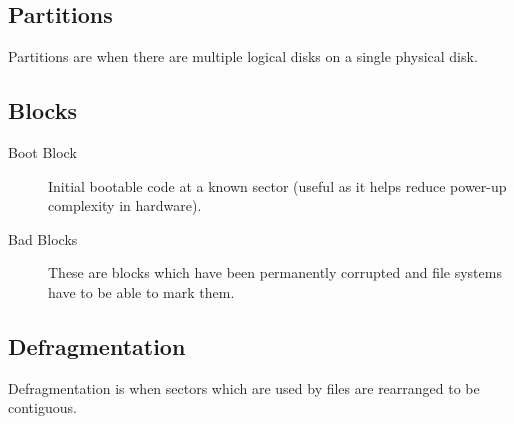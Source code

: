 \documentclass[11pt]{article}
\begin{document}
\subsection{Partitions}
\label{sec:orgd17add0}
Partitions are when there are multiple logical disks on a single physical disk.

\subsection{Blocks}
\label{sec:orgbbb8621}
\begin{description}
\item[{Boot Block}] Initial bootable code at a known sector (useful as it helps reduce power-up complexity in hardware).
\item[{Bad Blocks}] These are blocks which have been permanently corrupted and file systems have to be able to mark them.
\end{description}

\subsection{Defragmentation}
\label{sec:orgc701b5e}
Defragmentation is when sectors which are used by files are rearranged to be contiguous.
\end{document}
